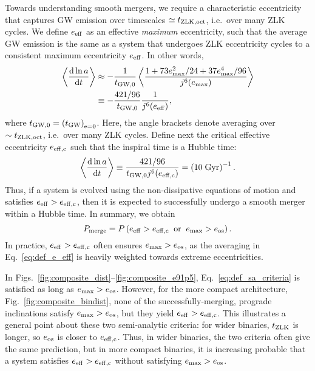 \documentclass[
        fleqn,
        usenatbib,
    ]{mnras}
\newcommand*{\rd}[2]{\frac{\mathrm{d}#1}{\mathrm{d}#2}}
\newcommand*{\ev}[1]{\left\langle#1\right\rangle}
\newcommand*{\p}[1]{\left(#1\right)}
\begin{document}
Towards understanding smooth mergers, we require a characteristic eccentricity
that captures GW emission over timescales $\simeq t_{\rm ZLK, oct}$, i.e.\ over
many ZLK cycles. We define $e_{\rm eff}$ as an effective \emph{maximum}
eccentricity, such that the average GW emission is the same as a system that
undergoes ZLK eccentricity cycles to a consistent maximum eccentricity $e_{\rm
eff}$. In other words,
\begin{align}
    \ev{\rd{\ln a}{t}} &\approx -\frac{1}{t_{\rm GW, 0}}
            \ev{\frac{1 + 73e_{\max}^2/24 + 37e_{\max}^4/96}
                {j^6(e_{\max})}}\nonumber\\
        &\equiv -\frac{421/96}{t_{\rm GW, 0}}\frac{1}{j^6(e_{\rm eff})},
        \label{eq:def_e_eff}
\end{align}
where $t_{\rm GW, 0} = \p{t_{\rm GW}}_{\rm e = 0}$. Here, the angle brackets
denote averaging over $\sim t_{\rm ZLK, oct}$, i.e.\ over many ZLK cycles.
Define next the critical effective eccentricity $e_{\rm eff, c}$ such that the
inspiral time is a Hubble time:
\begin{equation}
    \ev{\rd{\ln a}{t}} \equiv \frac{421/96}{t_{\rm GW, 0}j^6(e_{\rm eff, c})}
        = \p{10\;\mathrm{Gyr}}^{-1}. \label{eq:def_e_eff_c}
\end{equation}
Thus, if a system is evolved using the non-dissipative equations of motion and
satisfies $e_{\rm eff} > e_{\rm eff, c}$, then it is expected to successfully
undergo a smooth merger within a Hubble time. In summary, we obtain
\begin{equation}
    P_{\rm merge} = P\p{e_{\rm eff} > e_{\rm eff, c} \;\;\text{or}\;\;
        e_{\max} > e_{\rm os}}.\label{eq:def_sa_criteria}
\end{equation}
In practice, $e_{\rm eff} > e_{\rm eff, c}$ often ensures $e_{\max} > e_{\rm
os}$, as the averaging in Eq.~\eqref{eq:def_e_eff} is heavily weighted towards
extreme eccentricities.

In Figs.~\ref{fig:composite_dist}--\ref{fig:composite_e91p5},
Eq.~\eqref{eq:def_sa_criteria} is satisfied as long as $e_{\max} > e_{\rm os}$.
However, for the more compact architecture, Fig.~\ref{fig:composite_bindist},
none of the successfully-merging, prograde inclinations satisfy $e_{\max} >
e_{\rm os}$, but they yield $e_{\rm eff} > e_{\rm eff, c}$. This illustrates a
general point about these two semi-analytic criteria: for wider binaries,
$t_{\rm ZLK}$ is longer, so $e_{\rm os}$ is closer to $e_{\rm eff, c}$. Thus, in
wider binaries, the two criteria often give the same prediction, but in more
compact binaries, it is increasing probable that a system satisfies $e_{\rm eff}
> e_{\rm eff, c}$ without satisfying $e_{\max} > e_{\rm os}$.
\end{document}

